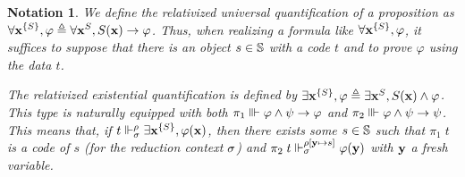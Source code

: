 \documentclass[a4paper,UKenglish,cleveref, autoref, thm-restate]{lipics-v2021}
\newtheorem{notation}[definition]{Notation}
\begin{document}

\begin{notation}
  We define the relativized universal quantification of a proposition%
  as
  $\displaystyle\forall \mathbf{x}^{\{S\}}, \varphi \triangleq \forall \mathbf{x}^S, S(\mathbf{x}) \to \varphi$.
  Thus, when realizing a formula like $\forall \mathbf{x}^{\{S\}}, \varphi$, it suffices to suppose that there is an object $s \in \mathbb S$ with a code $t$ and to prove $\varphi$ using the data $t$.

  The relativized existential quantification is defined by $\exists \mathbf{x}^{\{S\}}, \varphi \triangleq \exists \mathbf{x}^{S}, S(\mathbf{x}) \land \varphi$.
  This type is naturally equipped with both
  $\pi_1 \Vvdash \varphi \land \psi \to \varphi$ and $\pi_2 \Vvdash \varphi \land \psi \to \psi$.
  This means that, if $t\Vdash_{\sigma}^{\rho} \exists\mathbf{x}^{\{S\}}, \varphi(\mathbf{x})$, then there exists some $s \in \mathbb S$ such that $\pi_1\;t$ is a code of $s$ (for the reduction context $\sigma$) and $\pi_2\;t \Vdash_{\sigma}^{\rho[\mathbf{y}\mapsto s]} \varphi(\mathbf{y})$ with $\mathbf{y}$ a fresh variable.
\end{notation}
\end{document}
